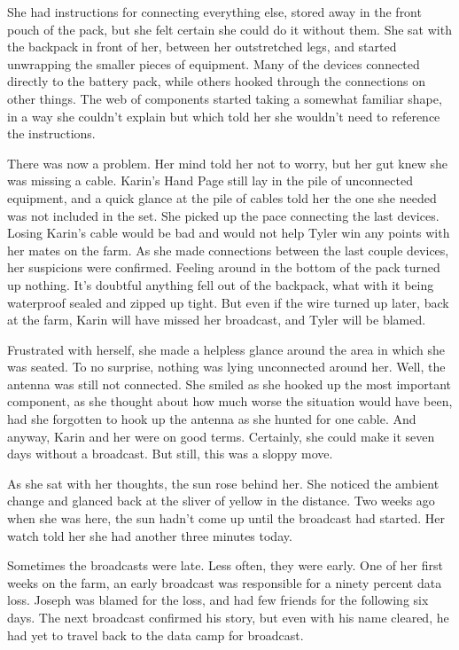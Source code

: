 \documentclass[courier]{sffms}
\begin{document}
She had instructions for connecting everything else, stored away
in the front pouch of the pack, but she felt certain she could
do it without them. She sat with the backpack in front of her,
between her outstretched legs, and started unwrapping the
smaller pieces of equipment. Many of the devices connected
directly to the battery pack, while others hooked through the
connections on other things. The web of components started
taking a somewhat familiar shape, in a way she couldn't explain
but which told her she wouldn't need to reference the
instructions.

There was now a problem. Her mind told her not to worry, but her
gut knew she was missing a cable. Karin's Hand Page still lay in
the pile of unconnected equipment, and a quick glance at the
pile of cables told her the one she needed was not included in
the set. She picked up the pace connecting the last devices.
Losing Karin's cable would be bad and would not help Tyler win
any points with her mates on the farm. As she made connections
between the last couple devices, her suspicions were confirmed.
Feeling around in the bottom of the pack turned up nothing. It's
doubtful anything fell out of the backpack, what with it being
waterproof sealed and zipped up tight. But even if the wire
turned up later, back at the farm, Karin will have missed her
broadcast, and Tyler will be blamed.

Frustrated with herself, she made a helpless glance around the
area in which she was seated. To no surprise, nothing was lying
unconnected around her. Well, the antenna was still not
connected. She smiled as she hooked up the most important
component, as she thought about how much worse the situation
would have been, had she forgotten to hook up the antenna as she
hunted for one cable. And anyway, Karin and her were on good
terms. Certainly, she could make it seven days without a
broadcast. But still, this was a sloppy move.

As she sat with her thoughts, the sun rose behind her. She
noticed the ambient change and glanced back at the sliver of
yellow in the distance. Two weeks ago when she was here, the sun
hadn't come up until the broadcast had started. Her watch told
her she had another three minutes today.

Sometimes the broadcasts were late. Less often, they were early.
One of her first weeks on the farm, an early broadcast was
responsible for a ninety percent data loss. Joseph was blamed
for the loss, and had few friends for the following six days.
The next broadcast confirmed his story, but even with his name
cleared, he had yet to travel back to the data camp for
broadcast.
\end{document}
